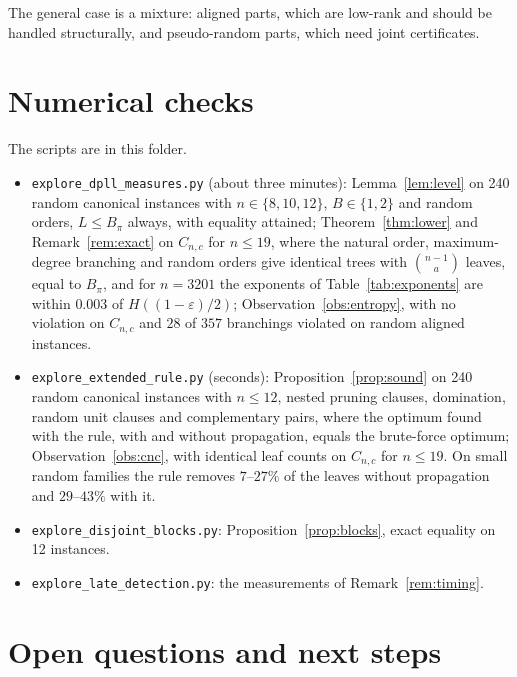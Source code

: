 \documentclass[11pt,a4paper]{article}
\theoremstyle{remark}
\begin{document}
The general case is a mixture: aligned parts, which are low-rank and should be
handled structurally, and pseudo-random parts, which need joint certificates.

\section{Numerical checks}

The scripts are in this folder.
\begin{itemize}
 \item \texttt{explore\_dpll\_measures.py} (about three minutes):
 Lemma~\ref{lem:level} on 240 random canonical instances with
 $n\in\{8,10,12\}$, $B\in\{1,2\}$ and random orders, $L\le B_\pi$ always, with
 equality attained; Theorem~\ref{thm:lower} and Remark~\ref{rem:exact} on
 $C_{n,c}$ for $n\le19$, where the natural order, maximum-degree branching and
 random orders give identical trees with $\binom{n-1}a$ leaves, equal to
 $B_\pi$, and for $n=3201$ the exponents of Table~\ref{tab:exponents} are
 within $0.003$ of $H((1-\varepsilon)/2)$; Observation~\ref{obs:entropy}, with
 no violation on $C_{n,c}$ and $28$ of $357$ branchings violated on random
 aligned instances.
 \item \texttt{explore\_extended\_rule.py} (seconds):
 Proposition~\ref{prop:sound} on 240 random canonical instances with $n\le12$,
 nested pruning clauses, domination, random unit clauses and complementary
 pairs, where the optimum found with the rule, with and without propagation,
 equals the brute-force optimum; Observation~\ref{obs:cnc}, with identical leaf
 counts on $C_{n,c}$ for $n\le19$. On small random families the rule removes
 $7$--$27\%$ of the leaves without propagation and $29$--$43\%$ with it.
 \item \texttt{explore\_disjoint\_blocks.py}: Proposition~\ref{prop:blocks},
 exact equality on 12 instances.
 \item \texttt{explore\_late\_detection.py}: the measurements of
 Remark~\ref{rem:timing}.
\end{itemize}

\section{Open questions and next steps}
\end{document}
